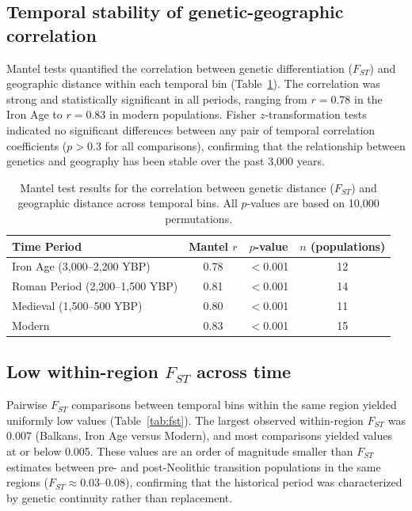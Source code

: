 \documentclass[11pt,a4paper]{article}
\begin{document}
\subsection{Temporal stability of genetic-geographic correlation}
Mantel tests quantified the correlation between genetic differentiation ($F_{ST}$) and geographic distance within each temporal bin (Table~\ref{tab:mantel}). The correlation was strong and statistically significant in all periods, ranging from $r = 0.78$ in the Iron Age to $r = 0.83$ in modern populations. Fisher $z$-transformation tests indicated no significant differences between any pair of temporal correlation coefficients ($p > 0.3$ for all comparisons), confirming that the relationship between genetics and geography has been stable over the past 3,000 years.

\begin{table}[ht]
\centering
\caption{Mantel test results for the correlation between genetic distance ($F_{ST}$) and geographic distance across temporal bins. All $p$-values are based on 10,000 permutations.}
\label{tab:mantel}
\begin{tabular}{@{}lccc@{}}
\toprule
\textbf{Time Period} & \textbf{Mantel $r$} & \textbf{$p$-value} & \textbf{$n$ (populations)} \\
\midrule
Iron Age (3,000--2,200 YBP)    & 0.78 & $<$0.001 & 12 \\
Roman Period (2,200--1,500 YBP) & 0.81 & $<$0.001 & 14 \\
Medieval (1,500--500 YBP)       & 0.80 & $<$0.001 & 11 \\
Modern                          & 0.83 & $<$0.001 & 15 \\
\bottomrule
\end{tabular}
\end{table}

\subsection{Low within-region $F_{ST}$ across time}
Pairwise $F_{ST}$ comparisons between temporal bins within the same region yielded uniformly low values (Table~\ref{tab:fst}). The largest observed within-region $F_{ST}$ was 0.007 (Balkans, Iron Age versus Modern), and most comparisons yielded values at or below 0.005. These values are an order of magnitude smaller than $F_{ST}$ estimates between pre- and post-Neolithic transition populations in the same regions ($F_{ST} \approx 0.03$--$0.08$), confirming that the historical period was characterized by genetic continuity rather than replacement.
\end{document}
